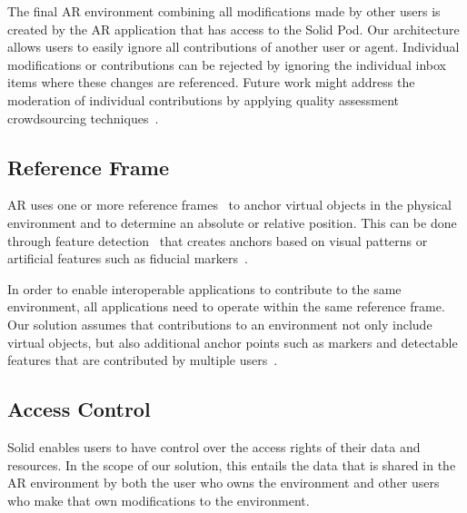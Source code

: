 The final AR environment combining all modifications made by other users is created by the AR application that has access to the Solid Pod. Our architecture allows users to easily ignore all contributions of another user or agent. Individual modifications or contributions can be rejected by ignoring the individual inbox items where these changes are referenced. Future work might address the moderation of individual contributions by applying quality assessment crowdsourcing techniques~\cite{10.1007/978-3-642-41338-4_17}.

\subsection{Reference Frame}
AR uses one or more reference frames~\cite{mou2004frames} to anchor virtual objects in the physical environment and to determine an absolute or relative position. This can be done through feature detection~\cite{10.1145/3301275.3302278} that creates anchors based on visual patterns or artificial features such as fiducial markers~\cite{kalaitzakis2021fiducial}.

In order to enable interoperable applications to contribute to the same environment, all applications need to operate within the same reference frame. Our solution assumes that contributions to an environment not only include virtual objects, but also additional anchor points such as markers and detectable features that are contributed by multiple users~\cite{fidmark}.

\subsection{Access Control}
Solid enables users to have control over the access rights of their data and resources. In the scope of our solution, this entails the data that is shared in the AR environment by both the user who owns the environment and other users who make that own modifications to the environment.